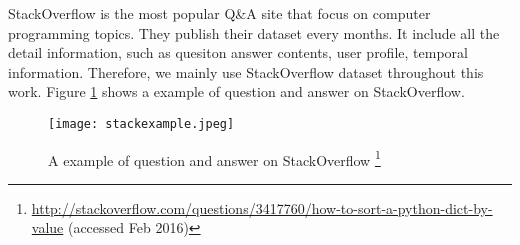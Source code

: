 StackOverflow is the most popular Q\&A site that focus on computer programming topics. They publish their dataset every months. It include all the detail information, such as quesiton answer contents, user profile, temporal information. Therefore, we mainly use StackOverflow dataset throughout this work. Figure \ref{fig:stackexample} shows a example of question and answer on StackOverflow.  
\begin{figure}%
\centering
\texttt{[image: stackexample.jpeg]}  
\caption{A example of question and answer on StackOverflow \footnote{\url{http://stackoverflow.com/questions/3417760/how-to-sort-a-python-dict-by-value} (accessed Feb 2016)}
}
\label{fig:stackexample} 
\end{figure}


